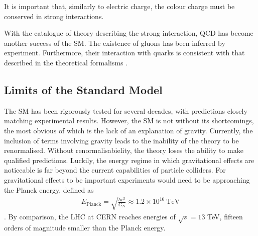 \noindent It is important that, similarly to electric charge, the colour charge must be conserved in strong interactions.

With the catalogue of theory describing the strong interaction, QCD has become another success of the SM.
The existence of gluons has been inferred by experiment.
Furthermore, their interaction with quarks is consistent with that described in the theoretical formalisms \cite{brandelik1979evidence}.

\subsection{Limits of the Standard Model}
The SM has been rigorously tested for several decades, with predictions closely matching experimental results.
However, the SM is not without its shortcomings, the most obvious of which is the lack of an explanation of gravity.
Currently, the inclusion of terms involving gravity leads to the inability of the theory to be renormalised.
Without renormalisabielity, the theory loses the ability to make qualified predictions. 
Luckily, the energy regime in which gravitational effects are noticeable is far beyond the current capabilities of particle colliders.
For gravitational effects to be important experiments would need to be approaching the Planck energy, defined as
\begin{align}
E_{\textrm{Planck}} = \sqrt{\frac{\hbar c^{5}}{G_{N}}} \approx 1.2 \times 10^{16}\ \textrm{TeV}
\end{align}
\cite{ade2014planck}. 
By comparison, the LHC at CERN reaches energies of $\sqrt{s} = 13$ TeV, fifteen orders of magnitude smaller than the Planck energy.

